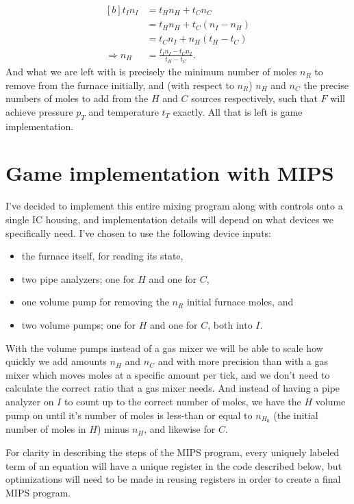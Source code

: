 \documentclass{article}
\begin{document}
\begin{equation}\label{eq:nH}
    \begin{aligned}[b]
        t_I n_I
        &= t_H n_H+t_C n_C \\
        &= t_H n_H+t_C(n_I-n_H) \\
        &= t_C n_I+n_H(t_H-t_C) \\
        \Rightarrow n_H &= \frac{t_I n_I-t_C n_I}{t_H-t_C}.
    \end{aligned}
\end{equation}
And what we are left with is precisely the minimum number of moles $n_R$ to
remove from the furnace initially, and (with respect to $n_R$) $n_H$ and $n_C$
the precise numbers of moles to add from the $H$ and $C$ sources respectively,
such that $F$ will achieve pressure $p_T$ and temperature $t_T$ exactly.
All that is left is game implementation.

\pagebreak

\section{Game implementation with MIPS}

I've decided to implement this entire mixing program along with controls onto a
single IC housing, and implementation details will depend on what devices we
specifically need.
I've chosen to use the following device inputs:
\begin{itemize}
    \item the furnace itself, for reading its state,
    \item two pipe analyzers; one for $H$ and one for $C$,
    \item one volume pump for removing the $n_R$ initial furnace moles, and
    \item two volume pumps; one for $H$ and one for $C$, both into $I$.
\end{itemize}
With the volume pumps instead of a gas mixer we will be able to scale how
quickly we add amounts $n_H$ and $n_C$ and with more precision than with
a gas mixer which moves moles at a specific amount per tick, and we don't need
to calculate the correct ratio that a gas mixer needs. And instead of having
a pipe analyzer on $I$ to count up to the correct number of moles, we have the
$H$ volume pump on until it's number of moles is less-than or equal to $n_{H_0}$
(the initial number of moles in $H$) minus $n_H$, and likewise for $C$.

For clarity in describing the steps of the MIPS program, every uniquely labeled
term of an equation will have a unique register in the code described below, but
optimizations will need to be made in reusing registers in order to create a
final MIPS program.
\end{document}
